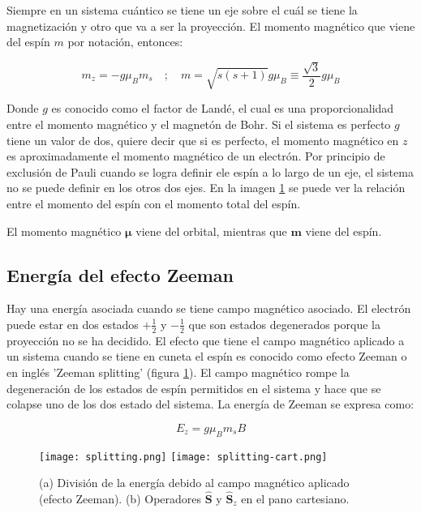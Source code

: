 \documentclass[11pt,fleqn]{book}
\renewcommand{\vec}[1]{\mathbf{#1}}
\begin{document}
Siempre en un sistema cuántico se tiene un eje sobre el cuál se tiene la magnetización y otro que va a ser la proyección. El momento magnético que viene del espín $m$ por notación, entonces:

\begin{equation}
        m_{z}=-g\mu_{B}m_{s}\quad;\quad        m=\sqrt{s(s+1)}g\mu_{B}\equiv\frac{\sqrt{3}}{2}g\mu_{B}
\label{Eq. 2.20}
\end{equation}

Donde $g$ es conocido como el factor de Landé, el cual es una proporcionalidad entre el momento magnético y el magnetón de Bohr. Si el sistema es perfecto $g$ tiene un valor de dos, quiere decir que si es perfecto, el momento magnético en $z$ es aproximadamente el momento magnético de un electrón. Por principio de exclusión de Pauli cuando se logra definir ele espín a lo largo de un eje, el sistema no se puede definir en los otros dos ejes. En la imagen \ref{Fig. 2.8} se puede ver la relación entre el momento del espín con el momento total del espín. 

\begin{remark}
El momento magnético $\vec{\mu}$ viene del orbital, mientras que $\vec{m}$ viene del espín.
\end{remark}

\subsection{Energía del efecto Zeeman}

Hay una energía asociada cuando  se tiene campo magnético asociado. El electrón puede estar en dos estados $+\frac{1}{2}$ y $-\frac{1}{2}$ que son estados degenerados porque la proyección no se ha decidido. El efecto que tiene el campo magnético aplicado a un sistema cuando se tiene en cuneta el espín es conocido como efecto Zeeman o en inglés 'Zeeman splitting' (figura \ref{Fig. 2.8}). El campo magnético rompe la degeneración de los estados de espín permitidos en el sistema y hace que se colapse uno de los dos estado del sistema. La energía de Zeeman se expresa como:

\begin{equation}
            E_{z}=g\mu_{B}m_{s}B
            \label{2.21}
\end{equation}

\begin{figure}[H]
        \centering
        \texttt{[image: splitting.png]}
        \texttt{[image: splitting-cart.png]}
        \caption{(a) División de la energía debido al campo magnético aplicado (efecto Zeeman). (b) Operadores $\hat{\vec{S}}$ y $\hat{\vec{S}}_{z}$ en el pano cartesiano.}
        \label{Fig. 2.8}
\end{figure}
\end{document}
